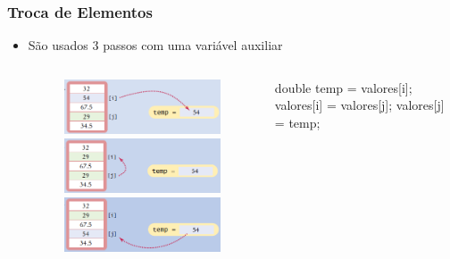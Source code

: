 \documentclass[xcolor={dvipsnames,table},aspectratio=169]{beamer}
\begin{document}
\begin{frame}[fragile]\frametitle{Troca de Elementos}
\begin{itemize}
	\item São usados 3 passos com uma variável auxiliar
\begin{columns}[T]
	\begin{column}{0.5\linewidth}
\begin{figure}[h]
	\includegraphics[height=0.20\paperheight,center]{pucrs-ep-fprog-unidade_06-arrays-laminas-swap_1.png}\\
	\includegraphics[height=0.20\paperheight,center]{pucrs-ep-fprog-unidade_06-arrays-laminas-swap_2.png}\\
	\includegraphics[height=0.20\paperheight,center]{pucrs-ep-fprog-unidade_06-arrays-laminas-swap_3.png}
\end{figure}
	\end{column}
	\begin{column}{0.5\linewidth}
\begin{javacode}
double temp = valores[i];
valores[i] = valores[j];
valores[j] = temp;  
\end{javacode}
	\end{column}
\end{columns}
\end{itemize}
\end{frame}
\end{document}
